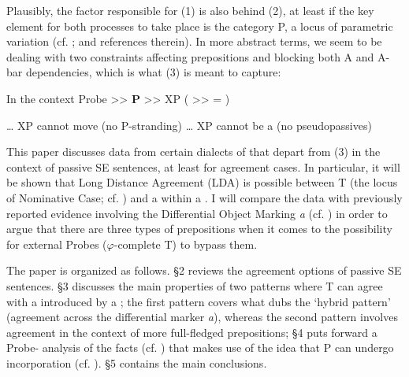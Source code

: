 \documentclass[output=paper]{langsci/langscibook}
\begin{document}
    \z

Plausibly, the factor responsible for (1) is also behind (2), at least if the key element for both processes to take place is the category P, a locus of parametric variation (cf. \citealt{Hornstein1981,Kayne1984,Kayne1994,Kayne2005,Abels2003}; and references therein). In more abstract terms, we seem to be dealing with two constraints affecting prepositions and blocking both A and A-bar dependencies, which is what (3) is meant to capture:

\ea%
    \label{ex:gallego:3}
     In the context Probe >>  \textbf{P}  >>  XP  ( >> = )\\
     \begin{xlisti}\setcounter{xnumii}{1}
     \ex \ldots\xspace XP cannot move (no P-stranding)
     \ex \ldots\xspace XP cannot be a  (no pseudopassives)
     \end{xlisti}
\z

This paper discusses data from certain dialects of  that depart from (3) in the context of passive SE sentences, at least for agreement cases. In particular, it will be shown that Long Distance Agreement (LDA) is possible between T (the locus of Nominative Case; cf. \citealt{Chomsky2000,Chomsky2001Derivation}) and a \CATDP {} within a \CATPP. I will compare the data with previously reported evidence involving the Differential Object Marking  \textit{a} (cf. \citealt{Torrego1998,López2012}) in order to argue that there are three types of prepositions when it comes to the possibility for external Probes ($\varphi $-complete T) to bypass them.

The paper is organized as follows. §2 reviews the agreement options of passive SE sentences. §3 discusses the main properties of two patterns where T can agree with a \CATDP introduced by a ; the first pattern covers what \citet{RAE-ASALE2009} dubs the ‘hybrid pattern’ (agreement across the differential marker \textit{a}), whereas the second pattern involves agreement in the context of more full-fledged prepositions; §4 puts forward a Probe- analysis of the facts (cf. \citealt{Chomsky2000,Chomsky2001Derivation}) that makes use of the idea that P can undergo incorporation (cf. \citealt{Hornstein1981,Law2006}). §5 contains the main conclusions.
\end{document}

